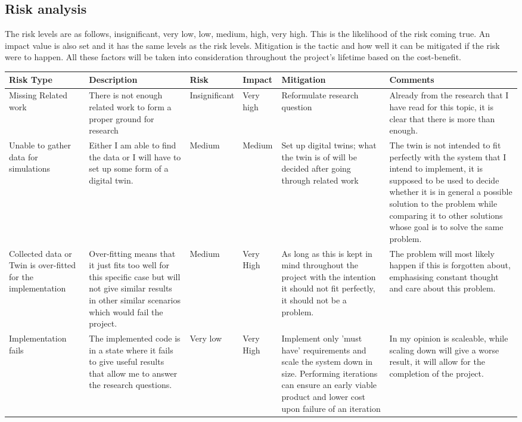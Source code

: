 \documentclass[a4paper,8pt]{article}
\begin{document}
		\subsection{Risk analysis}
			The risk levels are as follows, insignificant, very low, low, medium, high, very high. This is the likelihood of the risk coming true. An impact value is also set and it has the same levels as the risk levels. Mitigation is the tactic and how well it can be mitigated if the risk were to happen. All these factors will be taken into consideration throughout the project's lifetime based on the cost-benefit.
			{\scriptsize
			\begin{center}
				\begin{tabular}[!h]{|m{8em}|m{6em}|m{5em}|m{5em}|m{5em}|m{9em}|}
					\hline
					Risk Type & Description & Risk & Impact & Mitigation & Comments \\ \hline
					Missing Related work & There is not enough related work to form a proper ground for research & Insignificant & Very high & Reformulate research question & Already from the research that I have read for this topic, it is clear that there is more than enough. \\ \hline
					Unable to gather data for simulations & Either I am able to find the data or I will have to set up some form of a digital twin. & Medium & Medium & Set up digital twins; what the twin is of will be decided after going through related work & The twin is not intended to fit perfectly with the system that I intend to implement, it is supposed to be used to decide whether it is in general a possible solution to the problem while comparing it to other solutions whose goal is to solve the same problem.\\ \hline
					Collected data or Twin is over-fitted for the implementation & Over-fitting means that it just fits too well for this specific case but will not give similar results in other similar scenarios which would fail the project. & Medium & Very High & As long as this is kept in mind throughout the project with the intention it should not fit perfectly, it should not be a problem. & The problem will most likely happen if this is forgotten about, emphasising constant thought and care about this problem. \\ \hline
					Implementation fails & The implemented code is in a state where it fails to give useful results that allow me to answer the research questions. & Very low & Very High & Implement only 'must have' requirements and scale the system down in size. Performing iterations can ensure an early viable product and lower cost upon failure of an iteration & In my opinion is scaleable, while scaling down will give a worse result, it will allow for the completion of the project. \\ \hline
				\end{tabular}
			\end{center}
			}
\end{document}
